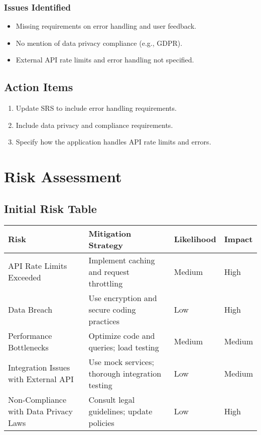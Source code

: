 \documentclass[12pt,a4paper]{report}
\begin{document}
\subsection{Issues Identified}
\begin{itemize}
    \item Missing requirements on error handling and user feedback.
    \item No mention of data privacy compliance (e.g., GDPR).
    \item External API rate limits and error handling not specified.
\end{itemize}

\section{Action Items}
\begin{enumerate}
    \item Update SRS to include error handling requirements.
    \item Include data privacy and compliance requirements.
    \item Specify how the application handles API rate limits and errors.
\end{enumerate}

\chapter{Risk Assessment}
\section{Initial Risk Table}
\begin{longtable}{p{4cm} p{5cm} p{2cm} p{2cm}}
\toprule
\textbf{Risk} & \textbf{Mitigation Strategy} & \textbf{Likelihood} & \textbf{Impact} \\
\midrule
API Rate Limits Exceeded & Implement caching and request throttling & Medium & High \\
Data Breach & Use encryption and secure coding practices & Low & High \\
Performance Bottlenecks & Optimize code and queries; load testing & Medium & Medium \\
Integration Issues with External API & Use mock services; thorough integration testing & Low & Medium \\
Non-Compliance with Data Privacy Laws & Consult legal guidelines; update policies & Low & High \\
\bottomrule
\end{longtable}
\end{document}

